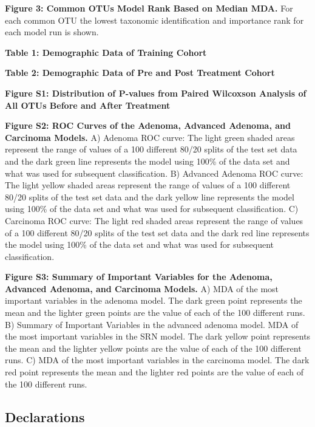 \documentclass[12pt,]{article}
\begin{document}
\textbf{Figure 3: Common OTUs Model Rank Based on Median MDA.} For each
common OTU the lowest taxonomic identification and importance rank for
each model run is shown.

\newpage

\textbf{Table 1: Demographic Data of Training Cohort}

\textbf{Table 2: Demographic Data of Pre and Post Treatment Cohort}

\newpage

\textbf{Figure S1: Distribution of P-values from Paired Wilcoxson
Analysis of All OTUs Before and After Treatment}

\textbf{Figure S2: ROC Curves of the Adenoma, Advanced Adenoma, and
Carcinoma Models.} A) Adenoma ROC curve: The light green shaded areas
represent the range of values of a 100 different 80/20 splits of the
test set data and the dark green line represents the model using 100\%
of the data set and what was used for subsequent classification. B)
Advanced Adenoma ROC curve: The light yellow shaded areas represent the
range of values of a 100 different 80/20 splits of the test set data and
the dark yellow line represents the model using 100\% of the data set
and what was used for subsequent classification. C) Carcinoma ROC curve:
The light red shaded areas represent the range of values of a 100
different 80/20 splits of the test set data and the dark red line
represents the model using 100\% of the data set and what was used for
subsequent classification.

\textbf{Figure S3: Summary of Important Variables for the Adenoma,
Advanced Adenoma, and Carcinoma Models.} A) MDA of the most important
variables in the adenoma model. The dark green point represents the mean
and the lighter green points are the value of each of the 100 different
runs. B) Summary of Important Variables in the advanced adenoma model.
MDA of the most important variables in the SRN model. The dark yellow
point represents the mean and the lighter yellow points are the value of
each of the 100 different runs. C) MDA of the most important variables
in the carcinoma model. The dark red point represents the mean and the
lighter red points are the value of each of the 100 different runs.

\newpage

\subsection{Declarations}\label{declarations}
\end{document}

